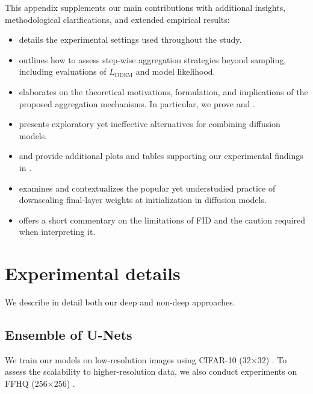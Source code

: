 \documentclass[10pt]{article} %
\newcommand{\DDSM}{\text{DDSM}}
\begin{document}
This appendix supplements our main contributions with additional insights, methodological clarifications, and extended empirical results:
\begin{itemize}
    \item {} details the experimental settings used throughout the study.
    \item {} outlines how to assess step-wise aggregation strategies beyond sampling, including evaluations of $L_\DDSM$ and model likelihood.
    \item {} elaborates on the theoretical motivations, formulation, and implications of the proposed aggregation mechanisms. In particular, we prove  and .
    \item {} presents exploratory yet ineffective alternatives for combining diffusion models.
    \item {} and  provide additional plots and tables supporting our experimental findings in .
    \item {} examines and contextualizes the popular yet understudied practice of downscaling final-layer weights at initialization in diffusion models.
    \item {} offers a short commentary on the limitations of FID and the caution required when interpreting it.
\end{itemize}

\section{Experimental details}\label{app: experiment details}

We describe in detail both our deep and non-deep approaches.

\subsection{Ensemble of U-Nets}

We train our models on low-resolution images using CIFAR-10 (32×32) \citep{krizhevsky2009learning}. To assess the scalability to higher-resolution data, we also conduct experiments on FFHQ (256×256) \citep{karras2019style}.
\end{document}
